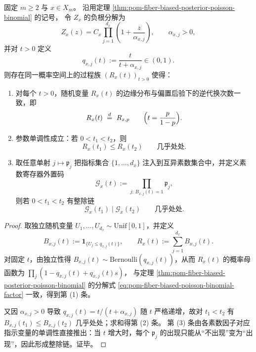 \begin{corollary}\label{cor:pom-fiber-leyang-monotone-coupling-prime-register}
固定 \(m\ge 2\) 与 \(x\in X_m\)。
沿用定理 \ref{thm:pom-fiber-biased-posterior-poisson-binomial} 的记号，
令 \(Z_x\) 的负根分解为
\[
Z_x(z)=C_x\prod_{j=1}^{d_x}\left(1+\frac{z}{\alpha_{x,j}}\right),
\qquad
\alpha_{x,j}>0,
\]
并对 \(t>0\) 定义
\[
q_{x,j}(t):=\frac{t}{t+\alpha_{x,j}}\in(0,1).
\]
则存在同一概率空间上的过程族 \((R_x(t))_{t>0}\) 使得：
\begin{enumerate}
  \item 对每个 \(t>0\)，随机变量 \(R_x(t)\) 的边缘分布与偏置后验下的逆代换次数一致，即
  \[
  R_x(t)\ \overset{d}{=}\ R_{x,p}\qquad\Bigl(t=\frac{p}{1-p}\Bigr).
  \]
  \item 参数单调性成立：若 \(0<t_1<t_2\)，则
  \[
  R_x(t_1)\le R_x(t_2)\qquad\text{几乎处处}.
  \]
  \item 取任意单射 \(j\mapsto \mathfrak p_j\) 把指标集合 \(\{1,\dots,d_x\}\) 注入到互异素数集合中，并定义素数寄存器外置码
  \[
  \mathcal{G}_x(t):=\prod_{j:\,B_{x,j}(t)=1}\mathfrak p_j,
  \]
  则若 \(0<t_1<t_2\) 有整除链
  \[
  \mathcal{G}_x(t_1)\mid \mathcal{G}_x(t_2)\qquad\text{几乎处处}.
  \]
\end{enumerate}
\end{corollary}
\begin{proof}
取独立随机变量 \(U_1,\dots,U_{d_x}\sim\mathrm{Unif}[0,1]\)，并定义
\[
B_{x,j}(t):=\mathbf 1_{\{U_j\le q_{x,j}(t)\}},
\qquad
R_x(t):=\sum_{j=1}^{d_x}B_{x,j}(t).
\]
对固定 \(t\)，由独立性得 \(B_{x,j}(t)\sim\mathrm{Bernoulli}(q_{x,j}(t))\)，从而 \(R_x(t)\) 的概率母函数为
\(
\prod_j(1-q_{x,j}(t)+q_{x,j}(t)s)
\)，
与定理 \ref{thm:pom-fiber-biased-posterior-poisson-binomial} 的分解式 \eqref{eq:pom-fiber-biased-poisson-binomial-factor} 一致，得到第 (1) 条。
\par
又因 \(\alpha_{x,j}>0\) 导致 \(q_{x,j}(t)=t/(t+\alpha_{x,j})\) 随 \(t\) 严格递增，故对 \(t_1<t_2\) 有
\(
B_{x,j}(t_1)\le B_{x,j}(t_2)
\)
几乎处处；求和得第 (2) 条。
第 (3) 条由各素数因子对应指示变量的单调性直接推出：当 \(t\) 增大时，每个 \(\mathfrak p_j\) 的出现只能从“不出现”变为“出现”，因此形成整除链。证毕。
\end{proof}

\endinput
